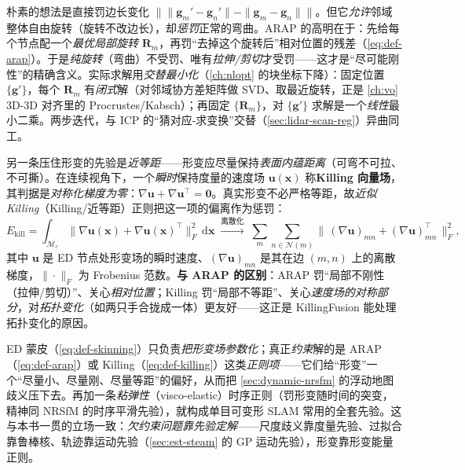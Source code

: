 \begin{derivation}
朴素的想法是直接罚边长变化 $\big\|\|\mathbf{g}_m'-\mathbf{g}_n'\|-\|\mathbf{g}_m-\mathbf{g}_n\|\big\|$。但它\emph{允许}邻域整体自由旋转（旋转不改边长），却\emph{惩罚}正常的弯曲。ARAP 的高明在于：先给每个节点配一个\emph{最优局部旋转} $\mathbf{R}_m$，再罚“去掉这个旋转后”相对位置的残差（\cref{eq:def-arap}）。于是\emph{纯旋转}（弯曲）不受罚、唯有\emph{拉伸/剪切}才受罚——这才是“尽可能刚性”的精确含义。实际求解用\emph{交替最小化}（\cref{ch:nlopt} 的块坐标下降）：固定位置 $\{\mathbf{g}'\}$，每个 $\mathbf{R}_m$ 有\emph{闭式}解（对邻域协方差矩阵做 SVD、取最近旋转，正是 \cref{ch:vo} 3D-3D 对齐里的 Procrustes/Kabsch）；再固定 $\{\mathbf{R}_m\}$，对 $\{\mathbf{g}'\}$ 求解是一个\emph{线性}最小二乘。两步迭代，与 ICP 的“猜对应-求变换”交替（\cref{sec:lidar-scan-reg}）异曲同工。
\end{derivation}

\begin{definition}\label{def:dyn-killing}
另一条压住形变的先验是\emph{近等距}——形变应尽量保持\emph{表面内蕴距离}（可弯不可拉、不可撕）。在连续视角下，一个\emph{瞬时}保持度量的速度场 $\mathbf{u}(\mathbf{x})$ 称\textbf{Killing 向量场}，其判据是\emph{对称化梯度为零}：$\nabla\mathbf{u}+\nabla\mathbf{u}^\top=\mathbf{0}$。真实形变不必严格等距，故\emph{近似 Killing}（Killing/近等距）正则把这一项的偏离作为惩罚：
\begin{equation}
  E_{\mathrm{kill}}=\int_{\mathcal{M}_c}\big\|\nabla\mathbf{u}(\mathbf{x})+\nabla\mathbf{u}(\mathbf{x})^\top\big\|_F^2\,\mathrm{d}\mathbf{x}
  \;\xrightarrow{\text{离散化}}\;
  \sum_{m}\sum_{n\in\mathcal{N}(m)} \big\|\,(\nabla\mathbf{u})_{mn}+(\nabla\mathbf{u})_{mn}^\top\,\big\|_F^2,
  \label{eq:def-killing}
\end{equation}
其中 $\mathbf{u}$ 是 ED 节点处形变场的瞬时速度、$(\nabla\mathbf{u})_{mn}$ 是其在边 $(m,n)$ 上的离散梯度，$\|\cdot\|_F$ 为 Frobenius 范数。\textbf{与 ARAP 的区别}：ARAP 罚“局部不刚性（拉伸/剪切）”、关心\emph{相对位置}；Killing 罚“局部不等距”、关心\emph{速度场的对称部分}，对\emph{拓扑变化}（如两只手合拢成一体）更友好——这正是 KillingFusion 能处理拓扑变化的原因。
\end{definition}

\begin{insight}
ED 蒙皮（\cref{eq:def-skinning}）只负责\emph{把形变场参数化}；真正\emph{约束}解的是 ARAP（\cref{eq:def-arap}）或 Killing（\cref{eq:def-killing}）这类\emph{正则项}——它们给“形变”一个“尽量小、尽量刚、尽量等距”的偏好，从而把 \cref{sec:dynamic-nrsfm} 的浮动地图歧义压下去。再加一条\emph{粘弹性}（visco-elastic）时序正则（罚形变随时间的突变，精神同 NRSfM 的时序平滑先验），就构成单目可变形 SLAM 常用的全套先验。这与本书一贯的立场一致：\emph{欠约束问题靠先验定解}——尺度歧义靠度量先验、过拟合靠鲁棒核、轨迹靠运动先验（\cref{sec:est-steam} 的 GP 运动先验），形变靠形变能量正则。
\end{insight}

